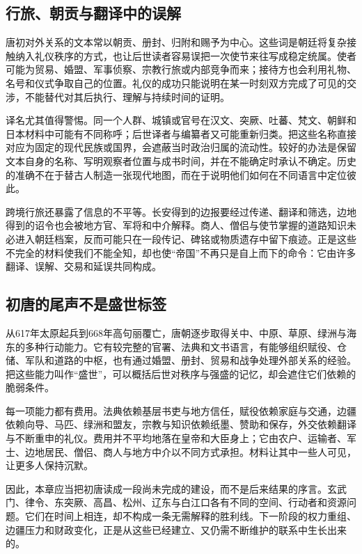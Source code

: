 \subsection{行旅、朝贡与翻译中的误解}
唐初对外关系的文本常以朝贡、册封、归附和赐予为中心。这些词是朝廷将复杂接触纳入礼仪秩序的方式，也让后世读者容易误把一次使节来往写成稳定统属。使者可能为贸易、婚盟、军事侦察、宗教行旅或内部竞争而来；接待方也会利用礼物、名号和仪式争取自己的位置。礼仪的成功只能说明在某一时刻双方完成了可见的交涉，不能替代对其后执行、理解与持续时间的证明。

译名尤其值得警惕。同一个人群、城镇或官号在汉文、突厥、吐蕃、梵文、朝鲜和日本材料中可能有不同称呼；后世译者与编纂者又可能重新归类。把这些名称直接对应为固定的现代民族或国界，会遮蔽当时政治归属的流动性。较好的办法是保留文本自身的名称、写明观察者位置与成书时间，并在不能确定时承认不确定。历史的准确不在于替古人制造一张现代地图，而在于说明他们如何在不同语言中定位彼此。

跨境行旅还暴露了信息的不平等。长安得到的边报要经过传递、翻译和筛选，边地得到的诏令也会被地方官、军将和中介解释。商人、僧侣与使节掌握的道路知识未必进入朝廷档案，反而可能只在一段传记、碑铭或物质遗存中留下痕迹。正是这些不完全的材料使我们不能全知，却也使“帝国”不再只是自上而下的命令：它由许多翻译、误解、交易和延误共同构成。

\subsection{初唐的尾声不是盛世标签}
从617年太原起兵到668年高句丽覆亡，唐朝逐步取得关中、中原、草原、绿洲与海东的多种行动能力。它有较完整的官署、法典和文书语言，有能够组织赋役、仓储、军队和道路的中枢，也有通过婚盟、册封、贸易和战争处理外部关系的经验。把这些能力叫作“盛世”，可以概括后世对秩序与强盛的记忆，却会遮住它们依赖的脆弱条件。

每一项能力都有费用。法典依赖基层书吏与地方信任，赋役依赖家庭与交通，边疆依赖向导、马匹、绿洲和盟友，宗教与知识依赖纸墨、赞助和保存，外交依赖翻译与不断重申的礼仪。费用并不平均地落在皇帝和大臣身上；它由农户、运输者、军士、边地居民、僧侣、商人与地方中介以不同方式承担。材料让其中一些人可见，让更多人保持沉默。

因此，本章应当把初唐读成一段尚未完成的建设，而不是后来结果的序言。玄武门、律令、东突厥、高昌、松州、辽东与白江口各有不同的空间、行动者和资源问题。它们在时间上相连，却不构成一条无需解释的胜利线。下一阶段的权力重组、边疆压力和财政变化，正是从这些已经建立、又仍需不断维护的联系中生长出来的。

